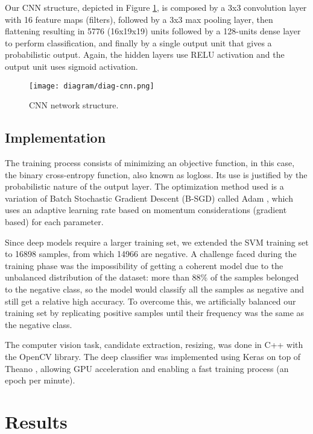         Our CNN structure, depicted in Figure \ref{fig:diag-cnn}, is composed by a 3x3 convolution layer with 16 feature maps (filters), followed by a 3x3 max pooling layer, then flattening resulting in 5776 (16x19x19) units followed by a 128-units dense layer to perform classification, and finally by a single output unit that gives a probabilistic output. Again, the hidden layers use RELU activation and the output unit uses sigmoid activation.

        \begin{figure}
        \centering
        \texttt{[image: diagram/diag-cnn.png]}
        \caption{CNN network structure.}
        \label{fig:diag-cnn}
        \end{figure}

    \subsection{Implementation}
        The training process consists of minimizing an objective function, in this case, the binary cross-entropy function, also known as logloss. Its use is justified by the probabilistic nature of the output layer. The optimization method used is a variation of Batch Stochastic Gradient Descent (B-SGD) called Adam \cite{kingma2014adam}, which uses an adaptive learning rate based on momentum considerations (gradient based) for each parameter.

        Since deep models require a larger training set, we extended the SVM training set to 16898 samples, from which 14966 are negative. A challenge faced during the training phase was the impossibility of getting a coherent model due to the unbalanced distribution of the dataset: more than 88\% of the samples belonged to the negative class, so the model would classify all the samples as negative and still get a relative high accuracy. To overcome this, we artificially balanced our training set by replicating positive samples until their frequency was the same as the negative class.

        The computer vision task, candidate extraction, resizing, was done in C++ with the OpenCV library. The deep classifier was implemented using Keras \cite{keras} on top of Theano \cite{theano}, allowing GPU acceleration and enabling a fast training process (an epoch per minute).


\section{Results}
\label{sec:results}

